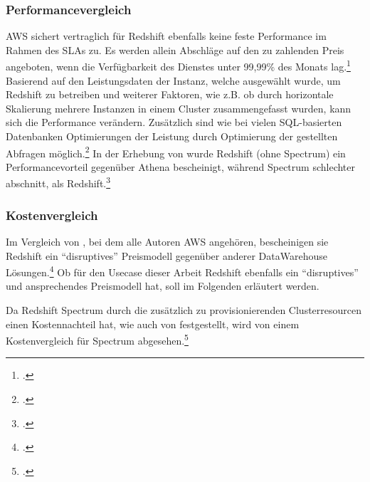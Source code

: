 \subsubsection{Performancevergleich}
\ac{AWS} sichert vertraglich für Redshift ebenfalls keine feste Performance im Rahmen des \acp{SLA} zu. Es werden allein Abschläge auf den zu zahlenden Preis angeboten, wenn die Verfügbarkeit des Dienstes unter 99,99\% des Monats lag.\footcite[Vgl.][]{AmazonWebServicesInc..2019b} Basierend auf den Leistungsdaten der Instanz, welche ausgewählt wurde, um Redshift zu betreiben und weiterer Faktoren, wie z.B. ob durch horizontale Skalierung mehrere Instanzen in einem Cluster zusammengefasst wurden, kann sich die Performance verändern. Zusätzlich sind wie bei vielen \ac{SQL}-basierten Datenbanken Optimierungen der Leistung durch Optimierung der gestellten Abfragen möglich.\footcite[Vgl.][]{AmazonWebServicesInc..o.J.ab} In der Erhebung von \citeauthor{Tan.2019} wurde Redshift (ohne Spectrum) ein Performancevorteil gegenüber Athena bescheinigt, während Spectrum schlechter abschnitt, als Redshift.\footcite[Vgl.][2176]{Tan.2019}


\subsubsection{Kostenvergleich}
Im Vergleich von \citeauthor{Gupta.2015}, bei dem alle Autoren \ac{AWS} angehören, bescheinigen sie Redshift ein \enquote{disruptives} Preismodell gegenüber anderer DataWarehouse Lösungen.\footcite[Vgl.][]{Gupta.2015} Ob für den Usecase dieser Arbeit Redshift ebenfalls ein \enquote{disruptives} und ansprechendes Preismodell hat, soll im Folgenden erläutert werden.

Da Redshift Spectrum durch die zusätzlich zu provisionierenden Clusterresourcen einen Kostennachteil hat, wie auch von \citeauthor{Tan.2019} festgestellt, wird von einem Kostenvergleich für Spectrum abgesehen.\footcite[Vgl.][2178]{Tan.2019}

